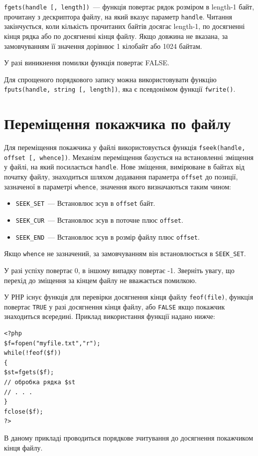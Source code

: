 \verb'fgets(handle [, length])'~--- функція повертає рядок розміром в length-1 байт, прочитану з дескриптора файлу, на який вказує параметр \verb'handle'. Читання закінчується, коли кількість прочитаних байтів досягає length-1, по досягненні кінця рядка або по досягненні кінця файлу. Якщо довжина не вказана, за замовчуванням її значення дорівнює 1 кілобайт або 1024 байтам.

У разі виникнення помилки функція повертає FALSE. 

Для спрощеного порядкового запису можна використовувати функцію \verb'fputs(handle, string [, length])', яка є псевдонімом функції \verb'fwrite()'.

\section{Переміщення покажчика по файлу}
Для переміщення покажчика у файлі використовується функція \verb'fseek(handle, offset [, whence])'. Механізм переміщення базується на встановленні зміщення у файлі, на який посилається \verb'handle'. Нове зміщення, вимірюване в байтах від початку файлу, знаходиться шляхом додавання параметра \verb'offset' до позиції, зазначеної в параметрі \verb'whence', значення якого визначаються таким чином:
\begin{itemize}
\item \verb'SEEK_SET'~--- Встановлює зсув в \verb'offset' байт.
\item \verb'SEEK_CUR'~--- Встановлює зсув в поточне плюс \verb'offset'.
\item \verb'SEEK_END'~--- Встановлює зсув в розмір файлу плюс \verb'offset'.
\end{itemize}

Якщо \verb'whence' не зазначений, за замовчуванням він встановлюється в \verb'SEEK_SET'.

У разі успіху повертає 0, в іншому випадку повертає -1. Зверніть увагу, що перехід до зміщення за кінцем файлу не вважається помилкою.

У РНР існує функція для перевірки досягнення кінця файлу \verb'feof(file)', функція повертає \verb'TRUE' у разі досягнення кінця файлу, або \verb'FALSE' якщо покажчик знаходиться всередині. Приклад використання функції надано нижче:

\begin{verbatim}
<?php
$f=fopen("myfile.txt","r");
while(!feof($f))
{ 
$st=fgets($f);
// обробка рядка $st
// . . .
}
fclose($f);
?>
\end{verbatim}
В даному прикладі проводиться порядкове зчитування до досягнення покажчиком кінця файлу.

